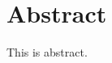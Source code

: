 \documentclass[../mainfile.tex]{subfiles}
\begin{document}
\section{Abstract}
This is abstract.
\end{document}
